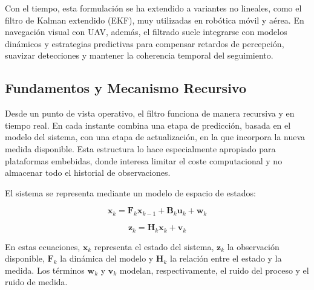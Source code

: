 \vspace{0.4cm}

Con el tiempo, esta formulación se ha extendido a variantes no lineales, como el filtro de Kalman extendido (EKF), muy utilizadas en robótica móvil y aérea. En navegación visual con UAV, además, el filtrado suele integrarse con modelos dinámicos y estrategias predictivas para compensar retardos de percepción, suavizar detecciones y mantener la coherencia temporal del seguimiento.

\vspace{0.4cm}

\subsection{Fundamentos y Mecanismo Recursivo}

Desde un punto de vista operativo, el filtro funciona de manera recursiva y en tiempo real. En cada instante combina una etapa de predicción, basada en el modelo del sistema, con una etapa de actualización, en la que incorpora la nueva medida disponible. Esta estructura lo hace especialmente apropiado para plataformas embebidas, donde interesa limitar el coste computacional y no almacenar todo el historial de observaciones.

\vspace{0.4cm}

El sistema se representa mediante un modelo de espacio de estados:

\vspace{0.4cm}

\begin{equation}
\mathbf{x}_k = \mathbf{F}_k \mathbf{x}_{k-1} + \mathbf{B}_k \mathbf{u}_k + \mathbf{w}_k
\end{equation}

\vspace{0.4cm}

\begin{equation}
\mathbf{z}_k = \mathbf{H}_k \mathbf{x}_k + \mathbf{v}_k
\end{equation}

\vspace{0.4cm}

En estas ecuaciones, $\mathbf{x}_k$ representa el estado del sistema, $\mathbf{z}_k$ la observación disponible, $\mathbf{F}_k$ la dinámica del modelo y $\mathbf{H}_k$ la relación entre el estado y la medida. Los términos $\mathbf{w}_k$ y $\mathbf{v}_k$ modelan, respectivamente, el ruido del proceso y el ruido de medida.

